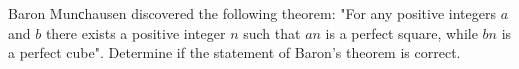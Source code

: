 Baron Munсhausen discovered the following theorem: "For any positive integers $a$ and  $b$ there exists a positive integer $n$ such that $an$ is a perfect square, while $bn$ is a perfect cube". Determine if the statement of Baron’s theorem is correct.
